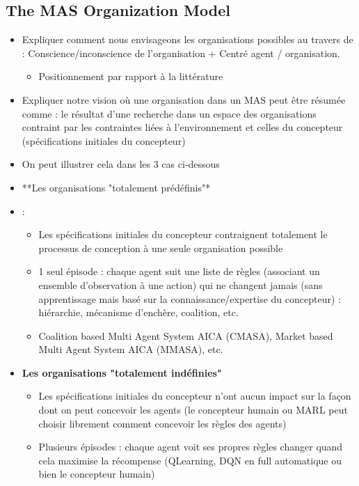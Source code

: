 \subsection{The MAS Organization Model}
\begin{itemize}

    \item Expliquer comment nous envisageons les organisations possibles au travers de : Conscience/inconscience de l’organisation + Centré agent / organisation.
          \begin{itemize}
              \item Positionnement par rapport à la littérature
          \end{itemize}
    \item Expliquer notre vision où une organisation dans un MAS peut être résumée comme : le résultat d'une recherche dans un espace des organisations contraint par les contraintes liées à l'environnement et celles du concepteur (spécifications initiales du concepteur)
    \item On peut illustrer cela dans les 3 cas ci-dessous
    \item **Les organisations "totalement prédéfinis"*\item :
          \begin{itemize}
              \item Les spécifications initiales du concepteur contraignent totalement le processus de conception à une seule organisation possible
              \item 1 seul épisode : chaque agent suit une liste de règles (associant un ensemble d’observation à une action) qui ne changent jamais (sans apprentissage mais basé sur la connaissance/expertise du concepteur) : hiérarchie, mécanisme d’enchère, coalition, etc.
              \item Coalition based Multi Agent System AICA (CMASA), Market based Multi Agent System AICA (MMASA), etc.
          \end{itemize}
    \item \textbf{Les organisations "totalement indéfinies"}
          \begin{itemize}
              \item Les spécifications initiales du concepteur n'ont aucun impact sur la façon dont on peut concevoir les agents (le concepteur humain ou MARL peut choisir librement comment concevoir les règles des agents)
              \item Plusieurs épisodes : chaque agent voit ses propres règles changer quand cela maximise la récompense (QLearning, DQN en full automatique ou bien le concepteur humain)

\end{itemize}
\end{itemize}
